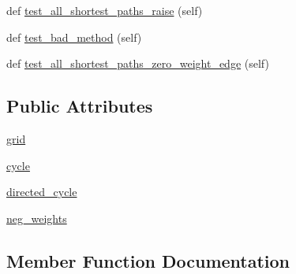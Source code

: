 \begin{DoxyCompactItemize}
\item 
def \hyperlink{classnetworkx_1_1algorithms_1_1shortest__paths_1_1tests_1_1test__generic_1_1TestGenericPath_acdad67d5d493849b05e23511176987fc}{test\+\_\+all\+\_\+shortest\+\_\+paths\+\_\+raise} (self)
\item 
def \hyperlink{classnetworkx_1_1algorithms_1_1shortest__paths_1_1tests_1_1test__generic_1_1TestGenericPath_ae970118d7deac6d45c5db465455c2ee7}{test\+\_\+bad\+\_\+method} (self)
\item 
def \hyperlink{classnetworkx_1_1algorithms_1_1shortest__paths_1_1tests_1_1test__generic_1_1TestGenericPath_a9f7661014eaacc4a4544ba08a9f138c9}{test\+\_\+all\+\_\+shortest\+\_\+paths\+\_\+zero\+\_\+weight\+\_\+edge} (self)
\end{DoxyCompactItemize}
\subsection*{Public Attributes}
\begin{DoxyCompactItemize}
\item 
\hyperlink{classnetworkx_1_1algorithms_1_1shortest__paths_1_1tests_1_1test__generic_1_1TestGenericPath_afbfa23035b54c5f00fe7fd8919980912}{grid}
\item 
\hyperlink{classnetworkx_1_1algorithms_1_1shortest__paths_1_1tests_1_1test__generic_1_1TestGenericPath_a0c85bc0fbd9be932bb506d54bb447d1e}{cycle}
\item 
\hyperlink{classnetworkx_1_1algorithms_1_1shortest__paths_1_1tests_1_1test__generic_1_1TestGenericPath_a9d68fe412643f8cf68cc37031c09c871}{directed\+\_\+cycle}
\item 
\hyperlink{classnetworkx_1_1algorithms_1_1shortest__paths_1_1tests_1_1test__generic_1_1TestGenericPath_a684f2870911933070fda31f73748cf33}{neg\+\_\+weights}
\end{DoxyCompactItemize}


\subsection{Member Function Documentation}
\mbox{\label{classnetworkx_1_1algorithms_1_1shortest__paths_1_1tests_1_1test__generic_1_1TestGenericPath_acd6a14a86970d0ec70a197fa5ee9095f}} 
